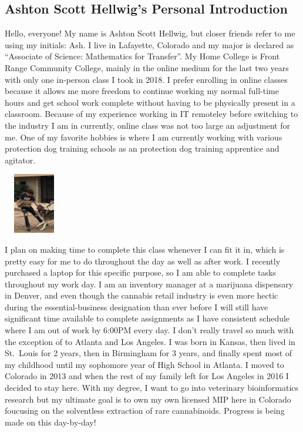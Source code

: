 \documentclass[stu,12pt]{apa7}
\begin{document}
    \newpage
    \subsection{Ashton Scott Hellwig's Personal Introduction}
      Hello, everyone! My name is Ashton Scott Hellwig, but closer friends refer
        to me using my initials: Ash. I live in Lafayette, Colorado and my major
        is declared as ``Associate of Science: Mathematics for Transfer''. My
        Home College is Front Range Community College, mainly in the online
        medium for the last two years with only one in-person class I took in
        2018. I prefer enrolling in online classes because it allows me more
        freedom to continue working my normal full-time hours and get school
        work complete without having to be physically present in a classroom.
        Because of my experience working in IT remoteley before switching to
        the industry I am in currently, online class was not too large an
        adjustment for me. One of my favorite hobbies is where I am currently
        working with various protection dog training schools as an protection
        dog training apprentice and agitator.

        \includegraphics[height=100px,width=100px]{KojackBiteWork1}

        I plan on making time to complete this class whenever I can fit it in,
        which is pretty easy for me to do throughout the day as well as after
        work. I recently purchased a laptop for this specific purpose, so I am
        able to complete tasks throughout my work day. I am an inventory manager
        at a marijuana dispensary in Denver, and even though the cannabis
        retail industry is even more hectic during the essential-business
        designation than ever before I will still have significant time
        available to complete assignments as I have consistent schedule where I
        am out of work by 6:00PM every day. I don't really travel so much with
        the exception of to Atlanta and Los Angeles. I was born in Kansas, then
        lived in St.\ Louis for 2 years, then in Birmingham for 3 years, and
        finally spent most of my childhood until my sophomore year of High
        School in Atlanta. I moved to Colorado in 2013 and when the rest of my
        family left for Los Angeles in 2016 I decided to stay here. With my
        degree, I want to go into veterinary bioinformatics research but my
        ultimate goal is to own my own licensed MIP here in Colorado foucusing
        on the solventless extraction of rare cannabinoids. Progress is being
        made on this day-by-day!
\end{document}
